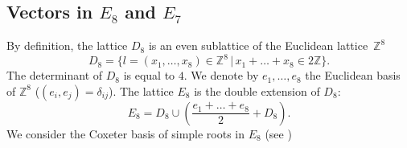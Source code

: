 \documentclass[a4paper,11pt]{article}
\newcommand{\ZZ}{\mathbb Z}
\begin{document}
\subsection{Vectors in $E_8$ and $E_7$}\label{subsect:E8}

By definition, the lattice $D_8$ is an even sublattice of the
Euclidean lattice~$\ZZ^8$
\begin{equation*}
D_8=\{l=(x_1,\dots,x_8)\in \ZZ^8\,|\, x_1+\dots+x_8\in 2\ZZ\}.
\end{equation*}
The determinant of $D_8$ is equal to $4$.
We denote by $e_1,\dots,e_8$ the Euclidean basis of $\ZZ^8$
($(e_i, e_j)=\delta_{ij}$).
The lattice $E_8$ is the double  extension of $D_8$:
\begin{equation*}
E_8=D_8\cup (\frac{e_1+\dots+e_8}{2}+D_8).
\end{equation*}
We consider the Coxeter basis of simple roots in $E_8$ (see
\cite{Bou})
\end{document}
